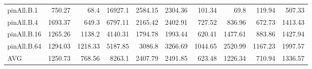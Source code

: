 \begin{table*}[]
\begin{center}
\begin{tabular}{|l|rrrrrrrr|r|}
 \hline
 pinAll.B.1   &  750.27 &    68.4 & 16927.1 & 2584.15 & 2304.36 &  101.34 &    69.8 &  119.94 &  507.33 \\
 pinAll.B.4   & 1693.37 &   649.3 & 6797.11 & 2165.42 & 2402.91 &  727.52 &  836.96 &  672.73 & 1413.43 \\
 pinAll.B.16  & 1265.26 &  1138.2 & 4140.31 & 1794.78 & 1993.44 &  620.41 & 1477.61 &  883.86 & 1427.94 \\
 pinAll.B.64  & 1294.03 & 1218.33 & 5187.85 &  3086.8 & 3266.69 & 1044.65 & 2520.99 & 1167.23 & 1997.57 \\
 \hline
 AVG          & 1250.73 &  768.56 &  8263.1 & 2407.79 & 2491.85 &  623.48 & 1226.34 &  710.94 & 1336.57 \\
\hline
\end{tabular}
\end{center}
\end{table*}
